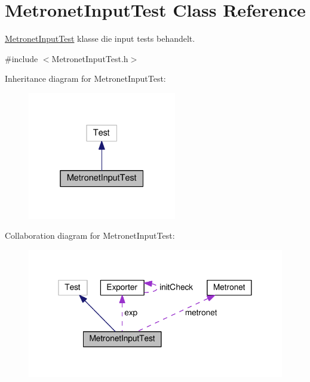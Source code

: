 \hypertarget{class_metronet_input_test}{}\section{Metronet\+Input\+Test Class Reference}
\label{class_metronet_input_test}


\hyperlink{class_metronet_input_test}{Metronet\+Input\+Test} klasse die input tests behandelt.  




{\ttfamily \#include $<$Metronet\+Input\+Test.\+h$>$}



Inheritance diagram for Metronet\+Input\+Test\+:
\nopagebreak
\begin{figure}[H]
\begin{center}
\leavevmode
\includegraphics[width=184pt]{class_metronet_input_test__inherit__graph}
\end{center}
\end{figure}


Collaboration diagram for Metronet\+Input\+Test\+:
\nopagebreak
\begin{figure}[H]
\begin{center}
\leavevmode
\includegraphics[width=338pt]{class_metronet_input_test__coll__graph}
\end{center}
\end{figure}
